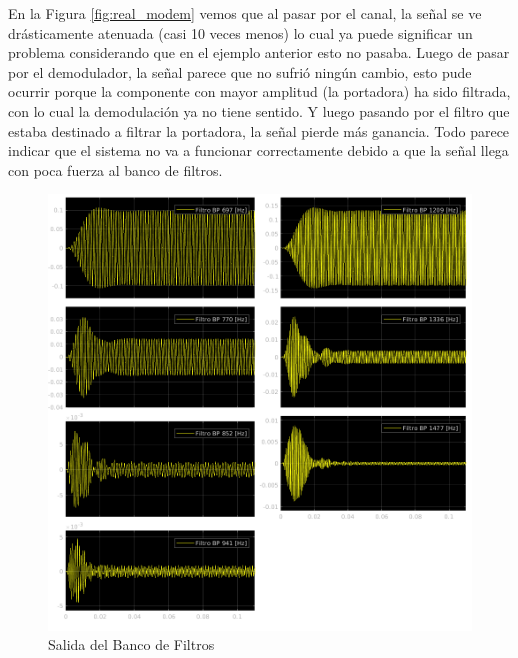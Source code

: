 \pagebreak

En la Figura \ref{fig:real_modem} vemos que al pasar por el canal, la señal se ve drásticamente atenuada (casi 10 veces menos) lo cual ya puede significar un problema considerando que en el ejemplo anterior esto no pasaba. Luego de pasar por el demodulador, la señal parece que no sufrió ningún cambio, esto pude ocurrir porque la componente con mayor amplitud (la portadora) ha sido filtrada, con lo cual la demodulación ya no tiene sentido. Y luego pasando por el filtro que estaba destinado a filtrar la portadora, la señal pierde más ganancia. Todo parece indicar que el sistema no va a funcionar correctamente debido a que la señal llega con poca fuerza al banco de filtros.

\begin{figure}[!htb]
  \centering
  \includegraphics[width=\linewidth]{images/simulacion/reducido/bank.png}
  \caption{Salida del Banco de Filtros}
  \label{fig:real_bank}
\end{figure}

